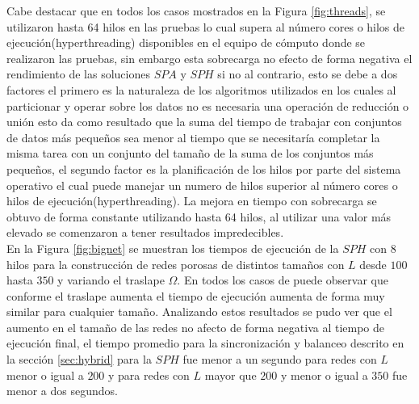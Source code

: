 \pagebreak
Cabe destacar que en todos los casos mostrados en la Figura \ref{fig:threads}, se utilizaron hasta 64 hilos en las pruebas lo cual supera al número cores o hilos de ejecución(hyperthreading) disponibles en el equipo de cómputo donde se realizaron las pruebas, sin embargo esta sobrecarga no efecto de forma negativa el rendimiento de las soluciones $SPA$ y $SPH$ si no al contrario, esto se debe a dos factores el primero es la naturaleza de los algoritmos utilizados en los cuales al particionar y operar sobre los datos no es necesaria una operación de reducción o unión esto da como resultado que la suma del tiempo de trabajar con conjuntos de datos más pequeños sea menor al tiempo que se necesitaría completar la misma tarea con un conjunto del tamaño de la suma de los conjuntos más pequeños, el segundo factor es la planificación de los hilos por parte del sistema operativo el cual puede manejar un numero de hilos superior al número cores o hilos de ejecución(hyperthreading). La mejora en tiempo con sobrecarga se obtuvo de forma constante utilizando hasta 64 hilos, al utilizar una valor más elevado se comenzaron a tener resultados impredecibles.\\

En la Figura \ref{fig:bignet} se muestran los tiempos de ejecución de la $SPH$ con $8$ hilos para la construcción de redes porosas de distintos tamaños con $L$ desde $100$ hasta $350$ y variando el traslape $\Omega$. En todos los casos de puede observar que conforme el traslape aumenta el tiempo de ejecución aumenta de forma muy similar para cualquier tamaño. Analizando estos resultados se pudo ver que el aumento en el tamaño de las redes no afecto de forma negativa al tiempo de ejecución final, el tiempo promedio para la sincronización y balanceo descrito en la sección \ref{sec:hybrid} para la $SPH$ fue menor a un segundo para redes con $L$ menor o igual a $200$ y para redes con $L$ mayor que $200$ y menor o igual a $350$ fue menor a dos segundos.

